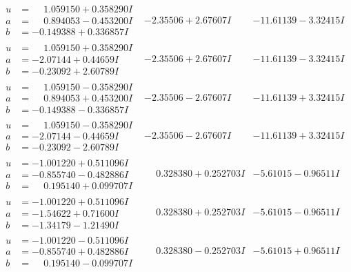 \documentclass[1p]{elsarticle_modified}
\theoremstyle{definition}
\begin{document}
$$\begin{array}{c|c|c}
\begin{aligned}
u &= \phantom{-}1.059150 + 0.358290 I \\
a &= \phantom{-}0.894053 - 0.453200 I \\
b &= -0.149388 + 0.336857 I\end{aligned}
 & -2.35506 + 2.67607 I & -11.61139 - 3.32415 I \\ \hline\begin{aligned}
u &= \phantom{-}1.059150 + 0.358290 I \\
a &= -2.07144 + 0.44659 I \\
b &= -0.23092 + 2.60789 I\end{aligned}
 & -2.35506 + 2.67607 I & -11.61139 - 3.32415 I \\ \hline\begin{aligned}
u &= \phantom{-}1.059150 - 0.358290 I \\
a &= \phantom{-}0.894053 + 0.453200 I \\
b &= -0.149388 - 0.336857 I\end{aligned}
 & -2.35506 - 2.67607 I & -11.61139 + 3.32415 I \\ \hline\begin{aligned}
u &= \phantom{-}1.059150 - 0.358290 I \\
a &= -2.07144 - 0.44659 I \\
b &= -0.23092 - 2.60789 I\end{aligned}
 & -2.35506 - 2.67607 I & -11.61139 + 3.32415 I \\ \hline\begin{aligned}
u &= -1.001220 + 0.511096 I \\
a &= -0.855740 - 0.482886 I \\
b &= \phantom{-}0.195140 + 0.099707 I\end{aligned}
 & \phantom{-}0.328380 + 0.252703 I & -5.61015 - 0.96511 I \\ \hline\begin{aligned}
u &= -1.001220 + 0.511096 I \\
a &= -1.54622 + 0.71600 I \\
b &= -1.34179 - 1.21490 I\end{aligned}
 & \phantom{-}0.328380 + 0.252703 I & -5.61015 - 0.96511 I \\ \hline\begin{aligned}
u &= -1.001220 - 0.511096 I \\
a &= -0.855740 + 0.482886 I \\
b &= \phantom{-}0.195140 - 0.099707 I\end{aligned}
 & \phantom{-}0.328380 - 0.252703 I & -5.61015 + 0.96511 I \\ \hline\begin{aligned}

\end{aligned}
\end{array}$$
\end{document}
